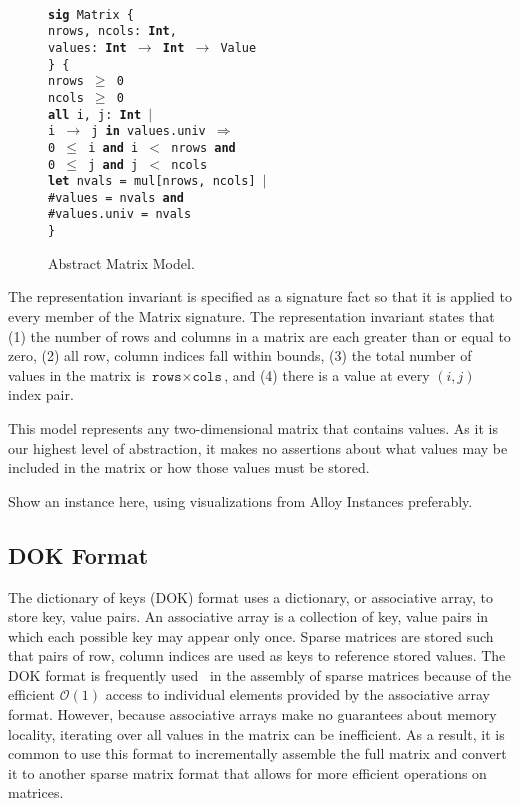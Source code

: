 \documentclass[11pt,conference]{IEEEtran}
\newenvironment{myquote}{\list{}{\leftmargin=12pt\rightmargin=0pt}\item[]}{\endlist}
\def\TA{\makebox[12pt]{}}
\def\TB{\makebox[24pt]{}}
\def\TC{\makebox[36pt]{}}
\def\Bsig{\textbf{sig} }
\def\Ball{\textbf{all} }
\def\Bin{\textbf{in} }
\def\Band{\textbf{and} }
\def\Bimplies{$\Rightarrow$ }
\def\Blet{\textbf{let} }
\def\Bint{\textbf{Int}}
\begin{document}
\begin{figure}
\centering
\begin{myquote}\small{\texttt{\\
\Bsig Matrix \{\\
\TA  nrows, ncols: \Bint,\\
\TA  values: \Bint~$\rightarrow$~\Bint~$\rightarrow$~Value\\
\} \{\\
\TA nrows $\geq$ 0\\
\TA ncols $\geq$ 0\\
\TA \Ball i, j: \Bint~$|$\\
\TB i $\rightarrow$ j \Bin values.univ \Bimplies\\
\TC 0 $\leq$ i \Band i $<$ nrows \Band\\
\TC 0 $\leq$ j \Band j $<$ ncols\\
\TA \Blet nvals = mul[nrows, ncols] $|$\\
\TB \#values = nvals \Band\\
\TB \#values.univ = nvals\\
\}
}}
\end{myquote}
\caption{Abstract Matrix Model.}
\label{model:abstract}
\end{figure}

The representation invariant is specified as a signature fact so that it is applied to every member of the Matrix signature.  The representation invariant states that (1) the number of rows and columns in a matrix are each greater than or equal to zero, (2) all row, column indices fall within bounds, (3) the total number of values in the matrix is $\texttt{rows}\times\texttt{cols}$, and (4) there is a value at every $\left(i, j\right)$ index pair.

This model represents any two-dimensional matrix that contains values.  As it is our highest level of abstraction, it makes no assertions about what values may be included in the matrix or how those values must be stored.

Show an instance here, using visualizations from Alloy Instances preferably.

\subsection{DOK Format}

The dictionary of keys (DOK) format uses a dictionary, or associative array, to store key, value pairs.  An associative array is a collection of key, value pairs in which each possible key may appear only once.  Sparse matrices are stored such that pairs of row, column indices are used as keys to reference stored values.  The DOK format is frequently used~\cite{scipy, eigenweb2010} in the assembly of sparse matrices because of the efficient \(\mathcal{O}(1)\) access to individual elements provided by the associative array format.  However, because associative arrays make no guarantees about memory locality, iterating over all values in the matrix can be inefficient.  As a result, it is common to use this format to incrementally assemble the full matrix and convert it to another sparse matrix format that allows for more efficient operations on matrices.
\end{document}
